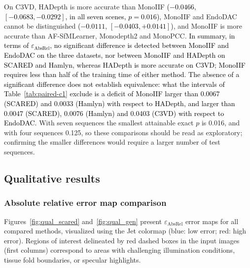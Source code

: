 \documentclass[a4paper,fleqn]{cas-dc}
\begin{document}
{On C3VD, HADepth is more accurate than MonoIIF \textcolor{black}{($-0.0466$, $[-0.0683, -0.0292]$, in all seven scenes, $p=0.016$)}, MonoIIF and EndoDAC cannot be distinguished \textcolor{black}{($-0.0111$, $[-0.0403, +0.0141]$)}, and MonoIIF is more accurate than AF-SfMLearner, Monodepth2 and MonoPCC.
\textcolor{black}{In summary, in terms of $\varepsilon_\textrm{AbsRel}$, no significant difference is detected between MonoIIF and EndoDAC on the three datasets, nor between MonoIIF and HADepth on SCARED and Hamlyn, whereas HADepth is more accurate on C3VD; MonoIIF requires less than half of the training time of either method. The absence of a significant difference does not establish equivalence: what the intervals of Table~\ref{tab:paired-c1} exclude is a deficit of MonoIIF larger than 0.0067 (SCARED) and 0.0033 (Hamlyn) with respect to HADepth, and larger than 0.0047 (SCARED), 0.0076 (Hamlyn) and 0.0403 (C3VD) with respect to EndoDAC.} With seven sequences the smallest attainable exact $p$ is 0.016, and with four sequences 0.125, so these comparisons should be read as exploratory; confirming the smaller differences would require a larger number of test sequences.
}
%
\subsection{Qualitative results}
\subsubsection{Absolute relative error map comparison}

Figures~\ref{fig:qual_scared} and~\ref{fig:qual_gen} present $\varepsilon_{\text{AbsRel}}$ error maps for 
all compared methods, visualized using the Jet colormap (blue: low error; red: high error). Regions of interest delineated by red dashed boxes in the input images (first columns) correspond to areas with challenging illumination conditions, tissue fold boundaries, or specular highlights.
\end{document}
